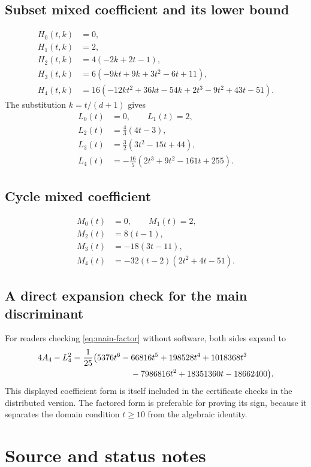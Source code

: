 \documentclass[11pt,a4paper]{article}
\numberwithin{equation}{section}
\theoremstyle{definition}
\theoremstyle{remark}
\begin{document}
\subsection{Subset mixed coefficient and its lower bound}
\begin{align*}
 H_0(t,k)&=0,\\
 H_1(t,k)&=2,\\
 H_2(t,k)&=4(-2k+2t-1),\\
 H_3(t,k)&=6(-9kt+9k+3t^2-6t+11),\\
 H_4(t,k)&=16(-12kt^2+36kt-54k+2t^3-9t^2+43t-51).
\end{align*}
The substitution $k=t/(d+1)$ gives
\begin{align*}
 L_0(t)&=0,\qquad L_1(t)=2,\\
 L_2(t)&=\frac43(4t-3),\\
 L_3(t)&=\frac32(3t^2-15t+44),\\
 L_4(t)&=-\frac{16}{5}(2t^3+9t^2-161t+255).
\end{align*}

\subsection{Cycle mixed coefficient}
\begin{align*}
 M_0(t)&=0,\qquad M_1(t)=2,\\
 M_2(t)&=8(t-1),\\
 M_3(t)&=-18(3t-11),\\
 M_4(t)&=-32(t-2)(2t^2+4t-51).
\end{align*}

\subsection{A direct expansion check for the main discriminant}

For readers checking \eqref{eq:main-factor} without software, both sides
expand to
\begin{align*}
 4A_4-L_4^2={}&\frac1{25}\bigl(
 5376t^6-66816t^5+198528t^4+1018368t^3\\
 &\hspace{20mm}{}-7986816t^2+18351360t-18662400\bigr).
\end{align*}
This displayed coefficient form is itself included in the certificate
checks in the distributed version. The factored form is preferable for
proving its sign, because it separates the domain condition $t\ge10$
from the algebraic identity.

\section{Source and status notes}\label{sec:status}
\end{document}
